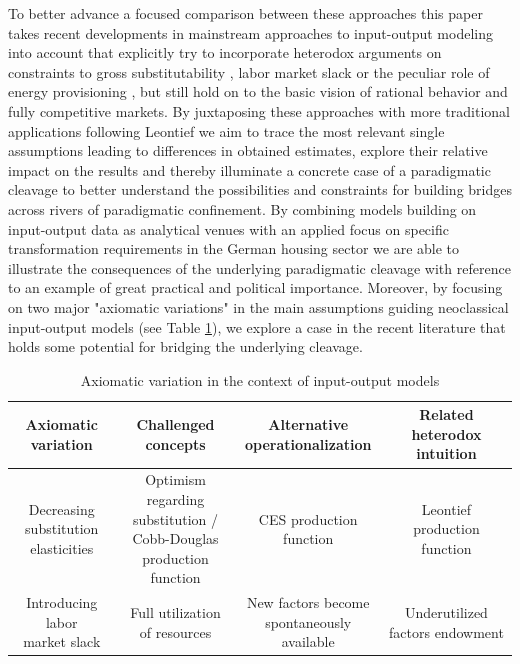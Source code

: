 To better advance a focused comparison between these approaches this paper takes recent developments in mainstream approaches to input-output modeling into account \citep{BF2019,Baqaee.2021,BF2022} that explicitly try to incorporate heterodox arguments on constraints to gross substitutability \citep[e.g.][]{davidson1994}, labor market slack \citep[e.g.][]{lavoie2014} or the peculiar role of energy provisioning \citep[e.g.][]{Keen.2018}, but still hold on to the basic vision of rational behavior and fully competitive markets. 
By juxtaposing these approaches with more traditional applications following Leontief we aim to trace the most relevant single assumptions leading to differences in obtained estimates, explore their relative impact on the results and thereby illuminate a concrete case of a paradigmatic cleavage to better understand the possibilities and constraints for building bridges across rivers of paradigmatic confinement. 
By combining models building on input-output data as analytical venues with an applied focus on specific transformation requirements in the German housing sector \citep[largely based on][]{Hornykewycz.2025} we are able to illustrate the consequences of the underlying paradigmatic cleavage with reference to an example of great practical and political importance. Moreover, by focusing on two major "axiomatic variations" \citep{Kapeller.2013} in the main assumptions guiding neoclassical input-output models (see Table \ref{tab:overview}), we explore a case in the recent literature that holds some potential for bridging the underlying cleavage.

\begin{table}
\label{tab:overview}
\centering
\scriptsize
\begin{tabular}{|c|c|c|c|} 
\hline
\textbf{Axiomatic variation} & \textbf{Challenged concepts} & \makecell{\textbf{Alternative}\\ \textbf{operationalization}} & \textbf{Related heterodox intuition}  \\ 
\hline
\makecell{Decreasing substitution\\elasticities} & \makecell{Optimism regarding\\substitution / Cobb-Douglas\\production function} & \makecell{CES production\\function} & Leontief production function       \\ 
\hline
\makecell{Introducing labor\\market slack} & Full utilization of resources & \makecell{New factors become\\spontaneously available} & Underutilized factors endowment \\ 
\hline
\end{tabular}
\caption{Axiomatic variation in the context of input-output models}

\end{table}

